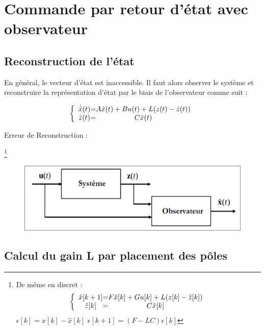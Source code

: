 \chapter{Commande par retour d'état avec observateur}
\section{Reconstruction de l'état}
En général, le vecteur d'état est inaccessible. Il faut alors observer le système et reconstruire la représentation d'état par le biais de l'observateur comme suit :
\begin{center}
    \Large{
            \[
        \left \{
        \begin{array}{c @{=} c}
            \dot{\hat{x}}(t) & A\hat{x}(t) + Bu(t) + L(z(t) - \hat{z}(t))\\
            \hat{z}(t) & C\hat{x}(t)
        \end{array}
        \right.
        \]
    } 
\end{center}
Erreur de Reconstruction :
\begin{center}
    \Large{}
    \Large{}
\end{center}
\footnote{
De même en discret : 
\[
    \left \{
    \begin{array}{c @{=} c}
        \hat{x}[k+1] & F\hat{x}[k] + Gu[k] + L(z[k] - \hat{z}[k])\\
        \hat{z}[k] & C\hat{x}[k]
    \end{array}
    \right.
\] \newline
$\epsilon[k] = x[k] - \hat{x}[k]$ \newline
$\epsilon[k+1] = (F - LC)\epsilon[k]$
}
\newpage
\begin{figure}[hbt!]
    \includegraphics[scale=0.7]{Pics/observateur_chap4.png}
\end{figure}
\section{Calcul du gain L par placement des pôles}
